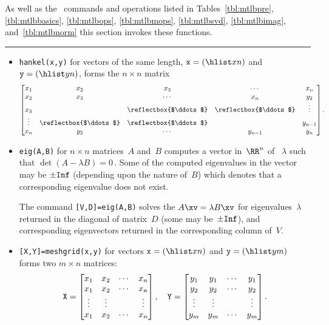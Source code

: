 \begin{draft}
\begin{table}
\caption{As well as the \script\ commands and operations listed in Tables~\ref{tbl:mtlbpre}, \ref{tbl:mtlbbasics}, \ref{tbl:mtlbops}, \ref{tbl:mtlbmops}, \ref{tbl:mtlbsvd}, \ref{tbl:mtlbimag}, and~\ref{tbl:mtlbnorm} this section invokes these functions.} \label{tbl:mtlbexpf}
\smallskip\hrule
\begin{minipage}{\linewidth}
\begin{itemize}
\item {}\verb|hankel(x,y)| for vectors of the same length, \(\verb|x|=(\hlist xn)\) and \(\verb|y|=(\hlist yn)\), forms the \(n\times n\) matrix
\def\adots{\reflectbox{$\ddots$}}
\begin{equation*}
\begin{bmatrix} 
x_1&x_2&x_3&\cdots&x_n \\
x_2&x_3&\cdots&x_n&y_2\\
x_3&&\adots&\adots&\vdots\\
\vdots&\adots&\adots&&y_{n-1}\\
x_n&y_2&\cdots&y_{n-1}&y_n
\end{bmatrix}.
\end{equation*}

\item {}\verb|eig(A,B)| for \(n\times n\) matrices~\(A\) and~\(B\) computes a vector in~\(\RR^n\) of ~\(\lambda\) such that \(\det(A-\lambda B)=0\)\,.
Some of the computed eigenvalues in the vector may be \(\pm\verb|Inf|\) (depending upon the nature of~\(B\)) which denotes that a corresponding eigenvalue does not exist.

The command \verb|[V,D]=eig(A,B)| solves the  \(A\xv=\lambda B\xv\) for eigenvalues~\(\lambda\) returned in the diagonal of matrix~\(D\) (some may be~\(\pm\verb|Inf|\)), and corresponding eigenvectors returned in the corresponding column of~\(V\).

\item {}\verb|[X,Y]=meshgrid(x,y)|  for vectors \(\verb|x|=(\hlist xn)\) and \(\verb|y|=(\hlist ym)\) forms two \(m\times n\) matrices:
\begin{equation*}
\verb|X|=\begin{bmatrix} x_1&x_2&\cdots&x_n\\
 x_1&x_2&\cdots&x_n\\
 \vdots&\vdots&&\vdots\\
 x_1&x_2&\cdots&x_n \end{bmatrix},
 \quad
\verb|Y|=\begin{bmatrix} y_1&y_1&\cdots&y_1\\
 y_2&y_2&\cdots&y_2\\
 \vdots&\vdots&&\vdots\\
 y_m&y_m&\cdots&y_m \end{bmatrix}.
\end{equation*}


\end{itemize}
\end{minipage}
\end{table}
\end{draft}
